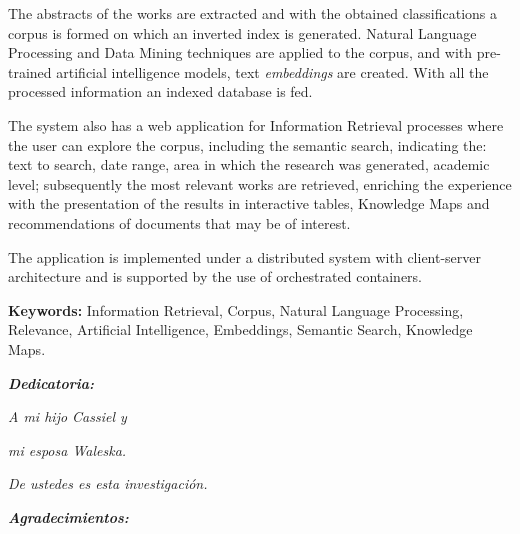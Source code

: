 The abstracts of the works are extracted and with the obtained classifications a corpus is formed on which an inverted index is generated. Natural Language Processing and Data Mining techniques are applied to the corpus, and with pre-trained artificial intelligence models, text \textit{embeddings} are created. With all the processed information an indexed database is fed.

The system also has a web application for Information Retrieval processes where the user can explore the corpus, including the semantic search, indicating the: text to search, date range, area in which the research was generated, academic level; subsequently the most relevant works are retrieved, enriching the experience with the presentation of the results in interactive tables, Knowledge Maps and recommendations of documents that may be of interest.

The application is implemented under a distributed system with client-server architecture and is supported by the use of orchestrated containers.

\vspace*{2cm}

\textbf{Keywords:} Information Retrieval, Corpus, Natural Language Processing, Relevance,  Artificial Intelligence, Embeddings, Semantic Search, Knowledge Maps.

\thispagestyle{empty}




\setlength{\abovedisplayskip}{-5pt}
\setlength{\abovedisplayshortskip}{-5pt}
\thispagestyle{empty}

\newpage
\begin{center}
\large{\textbf{\emph{\Huge{Dedicatoria:}}}}
\end{center}
\thispagestyle{empty}
\vspace*{5cm}
\thispagestyle{empty}
\begin{center} \Large \emph{A mi hijo Cassiel y  } \end{center}
\vspace*{1cm}
\begin{center} \Large \emph{mi esposa Waleska.} \end{center}
\vspace*{1cm}
\begin{center} \Large {\emph{De ustedes es esta investigación.}} \end{center}



\newpage
\begin{center}
\large{\textbf{\emph{\Huge{Agradecimientos:}}}}
\end{center}
\thispagestyle{empty}
\vspace*{2cm}
\thispagestyle{empty}

